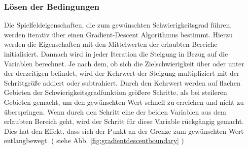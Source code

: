 \documentclass[a4paper,10pt,ngerman]{scrartcl}
\newcommand{\abbref}[1]{
  siehe Abb. \ref{#1}
}
\begin{document}
\subsubsection{Lösen der Bedingungen}
Die Spielfeldeigenschaften, die zum gewünschten Schwierigkeitsgrad führen, werden iterativ über einen Gradient-Descent Algorithmus bestimmt.
Hierzu werden die Eigenschaften mit den Mittelwerten der erlaubten Bereiche initialisiert.
Dannach wird in jeder Iteration die Steigung in Bezug auf die Variablen berechnet.
Je nach dem, ob sich die Zielschwierigkeit über oder unter der derzeitigen befindet,
wird der Kehrwert der Steigung multipliziert mit der Schrittgröße addiert oder subtrahiert.
Durch den Kehrwert werden auf flachen Gebieten der Schwierigkeitsgradfunktion größere Schritte, als bei steileren Gebieten gemacht,
um den gewünschten Wert schnell zu erreichen und nicht zu überspringen.
Wenn durch den Schritt eine der beiden Variablen aus dem erlaubten Bereich geht, wird der Schritt für diese Variable rückgängig gemacht.
Dies hat den Effekt, dass sich der Punkt an der Grenze zum gewünschten Wert entlangbewegt. (\abbref{fig:gradientdescentboundary})
\end{document}
